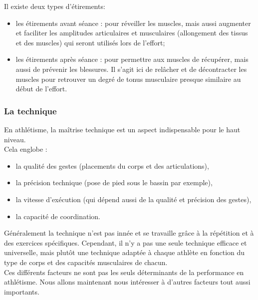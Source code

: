         Il existe deux types d'étirements: 
        \begin{itemize}
            \item les étirements avant séance :  pour réveiller les muscles, mais aussi augmenter et faciliter les amplitudes articulaires et musculaires (allongement des tissus et des muscles) qui seront utilisés lors de l'effort;
            \item les étirements après séance : pour permettre aux muscles de récupérer, mais aussi de prévenir les blessures.
            Il s’agit ici de relâcher et de décontracter les muscles pour retrouver un degré de tonus musculaire presque similaire au début de l’effort.\\
        \end{itemize}
                

        \subsubsection{La technique}
        
        En athlétisme, la maîtrise technique est un aspect indispensable pour le haut niveau.\\
        
        Cela englobe :
        \begin{itemize}
            \item la qualité des gestes (placements du corps et des articulations),
            \item la précision technique (pose de pied sous le bassin par exemple),
            \item la vitesse d’exécution (qui dépend aussi de la qualité et précision des gestes),
            \item la capacité de coordination.\\
        \end{itemize}
        
        Généralement la technique n'est pas innée et se travaille grâce à la répétition et à des exercices spécifiques. Cependant, il n'y a pas une seule technique efficace et universelle, mais plutôt une technique adaptée à chaque athlète en fonction du type de corps et des capacités musculaires de chacun.\\
    
        Ces différents facteurs ne sont pas les seuls déterminants de la performance en athlétisme. Nous allons maintenant nous intéresser à d'autres facteurs tout aussi importants.\\
        
